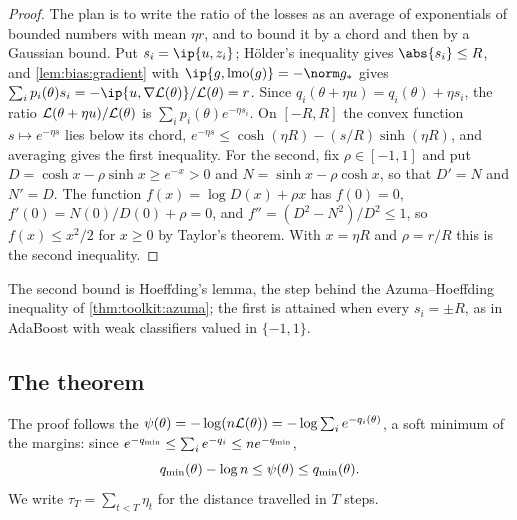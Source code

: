 \begin{refsection}
\begin{proof}
The plan is to write the ratio of the losses as an average of exponentials of bounded numbers with mean $\eta r$, and to bound it by a chord and then by a Gaussian bound. Put $s_i=\ip{u,z_i}$; Hölder's inequality gives $\abs{s_i}\le R$, and \cref{lem:bias:gradient} with $\ip{g,\lmo(g)}=-\norm g_*$ gives $\sum_ip_i(\theta)s_i=-\ip{u,\nabla\Loss(\theta)}/\Loss(\theta)=r$. Since $q_i(\theta+\eta u)=q_i(\theta)+\eta s_i$, the ratio $\mathcal{L}(\theta+\eta u)/\mathcal{L}(\theta)$ is $\sum_ip_i(\theta)e^{-\eta s_i}$. On $[-R,R]$ the convex function $s\mapsto e^{-\eta s}$ lies below its chord, $e^{-\eta s}\le\cosh(\eta R)-(s/R)\sinh(\eta R)$, and averaging gives the first inequality. For the second, fix $\rho\in[-1,1]$ and put $D=\cosh x-\rho\sinh x\ge e^{-x}>0$ and $N=\sinh x-\rho\cosh x$, so that $D'=N$ and $N'=D$. The function $f(x)=\log D(x)+\rho x$ has $f(0)=0$, $f'(0)=N(0)/D(0)+\rho=0$, and $f''=(D^2-N^2)/D^2\le1$, so $f(x)\le x^2/2$ for $x\ge0$ by Taylor's theorem. With $x=\eta R$ and $\rho=r/R$ this is the second inequality.
\end{proof}

The second bound is Hoeffding's lemma, the step behind the Azuma--Hoeffding inequality of \cref{thm:toolkit:azuma}; the first is attained when every $s_i=\pm R$, as in AdaBoost with weak classifiers valued in $\{-1,1\}$.

\subsection{The theorem}

The proof follows the  $\psi(\theta)=-\log(n\mathcal{L}(\theta))=-\log\sum_ie^{-q_i(\theta)}$, a soft minimum of the margins: since $e^{-q_{\min}}\le\sum_ie^{-q_i}\le ne^{-q_{\min}}$,
\begin{equation}\label{eq:bias:psi}
  q_{\min}(\theta)-\log n\le\psi(\theta)\le q_{\min}(\theta).
\end{equation}
We write $\tau_T=\sum_{t<T}\eta_t$ for the distance travelled in $T$ steps.


\end{refsection}
